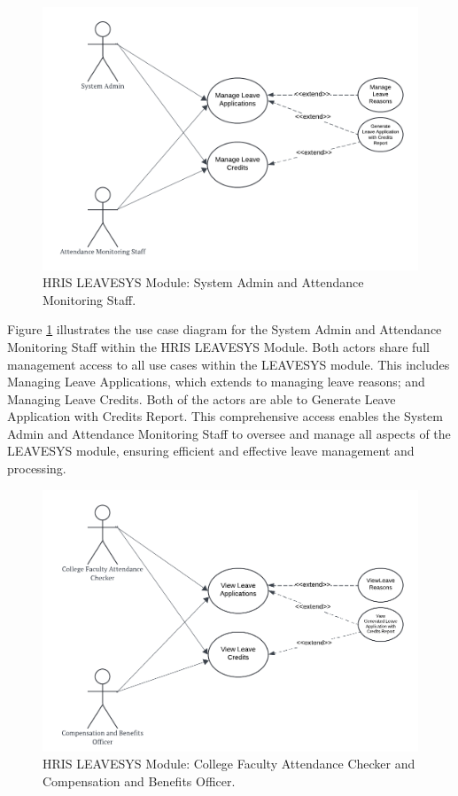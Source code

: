     \begin{figure}[H]
        \centering
        \includegraphics[width=0.9\linewidth]{figures/images/diagrams/usecase/use-case-leave-1.png}
        \caption{HRIS LEAVESYS Module: System Admin and Attendance Monitoring Staff.}
        \label{fig:use-case-leave-1}
    \end{figure}

    Figure \ref{fig:use-case-leave-1} illustrates the use case diagram for the System Admin and Attendance Monitoring Staff within the HRIS LEAVESYS Module. Both actors share full management access to all use cases within the LEAVESYS module. This includes Managing Leave Applications, which extends to managing leave reasons; and Managing Leave Credits. Both of the actors are able to Generate Leave Application with Credits Report. This comprehensive access enables the System Admin and Attendance Monitoring Staff to oversee and manage all aspects of the LEAVESYS module, ensuring efficient and effective leave management and processing.

    \begin{figure}[H]
        \centering
        \includegraphics[width=0.9\linewidth]{figures/images/diagrams/usecase/use-case-leave-2.png}
        \caption{HRIS LEAVESYS Module: College Faculty Attendance Checker and Compensation and Benefits Officer.}
        \label{fig:use-case-leave-2}
    \end{figure}

